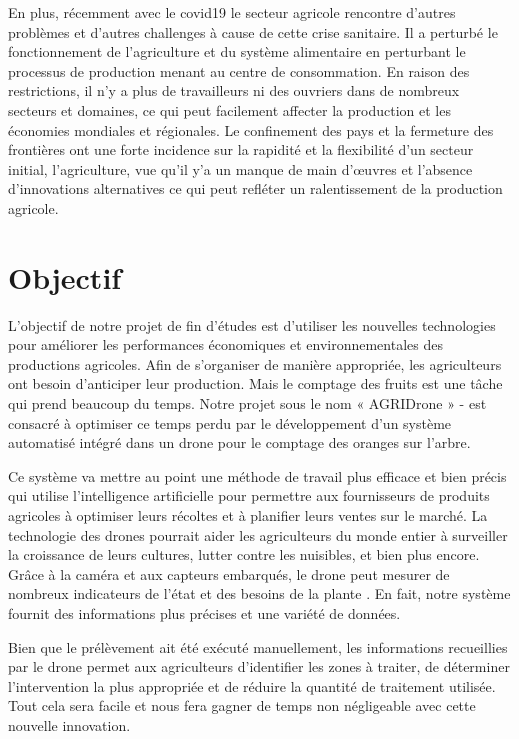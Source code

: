 	En plus, récemment avec le covid19 le secteur agricole rencontre d'autres problèmes et d'autres challenges à cause de cette crise sanitaire. Il a perturbé le fonctionnement de l'agriculture et du système alimentaire en perturbant le processus de production menant au centre de consommation. En raison des restrictions, il n'y a plus de travailleurs ni des ouvriers dans de nombreux secteurs et domaines, ce qui peut facilement affecter la production et les économies mondiales et régionales. Le confinement des pays et la fermeture des frontières ont une forte incidence sur la rapidité et la flexibilité d'un secteur initial, l'agriculture, vue qu'il y'a un manque de main d'œuvres et l'absence d'innovations alternatives ce qui peut refléter un ralentissement de la production agricole.
	\section{Objectif }
	L'objectif de notre projet de fin d'études est d'utiliser les nouvelles technologies pour améliorer les performances économiques et environnementales des productions agricoles. Afin de s'organiser de manière appropriée, les agriculteurs ont besoin d'anticiper leur production. Mais le comptage des fruits est une tâche qui prend beaucoup du temps. Notre projet sous le nom « AGRIDrone » - est consacré à optimiser ce temps perdu par le développement d'un système automatisé intégré dans un drone pour le comptage des oranges sur l'arbre. 
	
	
	Ce système va mettre au point une méthode de travail plus efficace et bien précis qui utilise l'intelligence artificielle pour permettre aux fournisseurs de produits agricoles à optimiser leurs récoltes et à planifier leurs ventes sur le marché. La technologie des drones pourrait aider les agriculteurs du monde entier à surveiller la croissance de leurs cultures, lutter contre les nuisibles, et bien plus encore. Grâce à la caméra et aux capteurs embarqués, le drone peut mesurer de nombreux indicateurs de l'état et des besoins de la plante . En fait, notre système fournit des informations plus précises et une variété de données.
	
	Bien que le prélèvement ait été exécuté manuellement, les informations recueillies par le drone permet aux agriculteurs d'identifier les zones à traiter, de déterminer l'intervention la plus appropriée et de réduire la quantité de traitement utilisée. Tout cela sera facile et nous fera gagner de temps non négligeable avec cette nouvelle innovation.
	

